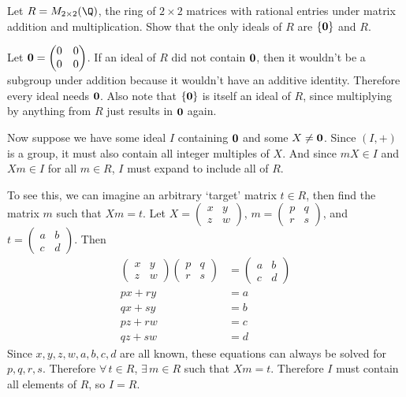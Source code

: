 \documentclass[a4paper]{article}
\begin{document}

\begin{questionbody}
Let $R = M_{2 \times 2}(\Q)$, the ring of $2 \times 2$ matrices with rational entries under matrix addition and multiplication. Show that the only ideals of $R$ are $\{\bf 0\}$ and $R$.
\end{questionbody}

Let $\bf 0 = \begin{pmatrix}0 & 0 \\ 0 & 0\end{pmatrix}$. If an ideal of $R$ did not contain $\bf 0$, then it wouldn't be a subgroup under addition because it wouldn't have an additive identity. Therefore every ideal needs $\bf 0$. Also note that $\{ \bf 0 \}$ is itself an ideal of $R$, since multiplying by anything from $R$ just results in $\bf 0$ again.

Now suppose we have some ideal $I$ containing $\bf 0$ and some $X \ne \bf 0$. Since $(I, +)$ is a group, it must also contain all integer multiples of $X$. And since $mX \in I$ and $Xm \in I$ for all $m \in R$, $I$ must expand to include all of $R$.

To see this, we can imagine an arbitrary \enquote*{target} matrix $t \in R$, then find the matrix $m$ such that $Xm = t$. Let $X = \begin{pmatrix}x & y \\ z & w\end{pmatrix}$, $m = \begin{pmatrix}p & q \\ r & s\end{pmatrix}$, and $t = \begin{pmatrix}a & b \\ c & d\end{pmatrix}$. Then \begin{align*}
    \begin{pmatrix}x & y \\ z & w\end{pmatrix} \begin{pmatrix}p & q \\ r & s\end{pmatrix} &= \begin{pmatrix}a & b \\ c & d\end{pmatrix} \\[1ex]
    px + ry &= a \\
    qx + sy &= b \\
    pz + rw &= c \\
    qz + sw &= d
\end{align*}
Since $x, y, z, w, a, b, c, d$ are all known, these equations can always be solved for $p, q, r, s$. Therefore $\forall\, t \in R$, $\exists\, m \in R$ such that $Xm = t$. Therefore $I$ must contain all elements of $R$, so $I = R$.
\end{document}
